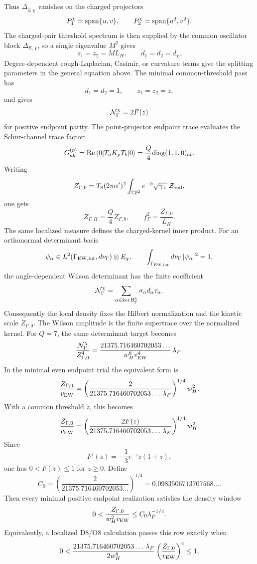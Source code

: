 \documentclass[11pt]{article}
\theoremstyle{definition}
\theoremstyle{remark}
\newcommand{\CP}{\mathbb{CP}}
\begin{document}
Thus \(\Delta_{\bar\partial,\chi}\) vanishes on the charged projectors
\[
  P_1^\chi={\rm span}\{u,v\},
  \qquad
  P_2^\chi={\rm span}\{u^2,v^2\}.
\]
The charged-pair threshold spectrum is then supplied by the common oscillator
block \(\Delta_{E,\chi}\), so a single eigenvalue \(M^2\) gives
\[
  z_1=z_2=ML_H,\qquad d_1=d_2=d_\chi .
\]
Degree-dependent rough-Laplacian, Casimir, or curvature terms give the
splitting parameters in the general equation above.
The minimal common-threshold pass has
\[
  d_1=d_2=1,\qquad z_1=z_2=z,
\]
and gives
\[
  {\cal N}_\Gamma^\chi=2F(z)
\]
for positive endpoint parity.
The point-projector endpoint trace evaluates the Schur-channel trace factor:
\[
  G_{ab}^{(p)}
  =
  {\rm Re}\,\langle0|T_aK_pT_b|0\rangle
  =
  \frac{Q}{4}{\rm diag}(1,1,0)_{ab}.
\]
Writing
\[
  Z_{\Gamma,0}
  =
  T_8(2\pi\alpha')^2
  \int_{\CP^2}
  e^{-\phi}\sqrt{\gamma_\perp}\,{\cal Z}_{\rm end},
\]
one gets
\[
  Z_{\Gamma,H}=\frac{Q}{4}Z_{\Gamma,0},
  \qquad
  f_\Gamma^2=\frac{Z_{\Gamma,0}}{L_H}.
\]
The same localized measure defines the charged-kernel inner product.  For an
orthonormal determinant basis
\[
  \psi_\alpha\in
  L^2(\Gamma_{\rm EW,int},d\nu_\Gamma)\otimes E_\chi,
  \qquad
  \int_{\Gamma_{\rm EW,int}}d\nu_\Gamma\,|\psi_\alpha|^2=1 ,
\]
the angle-dependent Wilson determinant has the finite coefficient
\[
  {\cal N}_\Gamma^\chi
  =
  \sum_{\alpha\in\ker{\cal B}_\Gamma^\chi}
  \sigma_\alpha d_\alpha\tau_\alpha .
\]
Consequently the local density fixes the Hilbert normalization and the kinetic
scale \(Z_{\Gamma,0}\).  The Wilson amplitude is the finite supertrace over
the normalized kernel.
For \(Q=7\), the same determinant target becomes
\[
  \frac{{\cal N}_\Gamma^\chi}{Z_{\Gamma,0}^4}
  =
  \frac{21375.716460702053\ldots}
       {w_H^8v_{\rm EW}^4}\,\lambda_F .
\]
In the minimal even endpoint trial the equivalent form is
\[
  \frac{Z_{\Gamma,0}}{v_{\rm EW}}
  =
  \left(
  \frac{2}{21375.716460702053\ldots\,\lambda_F}
  \right)^{1/4}w_H^2 .
\]
With a common threshold \(z\), this becomes
\[
  \frac{Z_{\Gamma,0}}{v_{\rm EW}}
  =
  \left(
  \frac{2F(z)}{21375.716460702053\ldots\,\lambda_F}
  \right)^{1/4}w_H^2 .
\]
Since
\[
  F'(z)=-\frac13e^{-z}z(1+z),
\]
one has \(0<F(z)\leq1\) for \(z\geq0\).  Define
\[
  C_0=
  \left(
  \frac{2}{21375.716460702053\ldots}
  \right)^{1/4}
  =
  0.0983506713707568\ldots .
\]
Then every minimal positive endpoint realization satisfies the density window
\[
  0<
  \frac{Z_{\Gamma,0}}{w_H^2v_{\rm EW}}
  \leq
  C_0\lambda_F^{-1/4}.
\]
Equivalently, a localized D8/O8 calculation passes this row exactly when
\[
  0<
  \frac{21375.716460702053\ldots\,\lambda_F}{2w_H^8}
  \left(\frac{Z_{\Gamma,0}}{v_{\rm EW}}\right)^4
  \leq1,
\]
\end{document}
